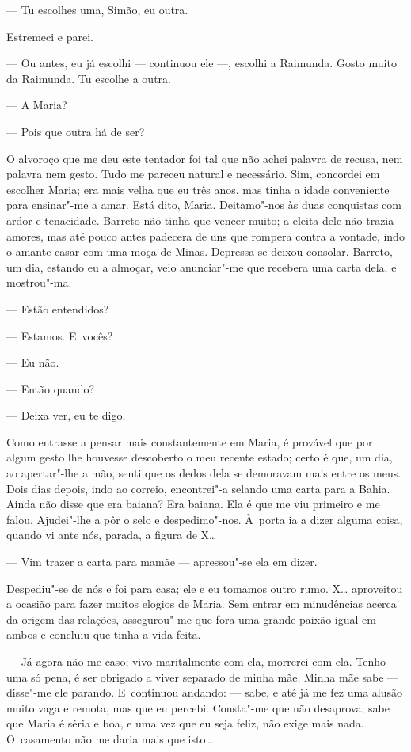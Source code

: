\begin{linenumbers}
--- Tu escolhes uma, Simão, eu outra.

Estremeci e parei.

--- Ou antes, eu já escolhi --- continuou ele ---, escolhi a Raimunda.
Gosto muito da Raimunda. Tu escolhe a outra.

--- A Maria?

--- Pois que outra há de ser?

O alvoroço que me deu este tentador foi tal que não achei palavra de
recusa, nem palavra nem gesto. Tudo me pareceu natural e necessário.
Sim, concordei em escolher Maria; era mais velha que eu três anos, mas
tinha a idade conveniente para ensinar"-me a amar. Está dito, Maria.
Deitamo"-nos às duas conquistas com ardor e tenacidade. Barreto não tinha
que vencer muito; a eleita dele não trazia amores, mas até pouco antes
padecera de uns que rompera contra a vontade, indo o amante casar com
uma moça de Minas. Depressa se deixou consolar. Barreto, um dia, estando
eu a almoçar, veio anunciar"-me que recebera uma carta dela, e
mostrou"-ma.

--- Estão entendidos?

--- Estamos. E~vocês?

--- Eu não.

--- Então quando?

--- Deixa ver, eu te digo.

Como entrasse a pensar mais constantemente em Maria, é provável que por
algum gesto lhe houvesse descoberto o meu recente estado; certo é que,
um dia, ao apertar"-lhe a mão, senti que os dedos dela se demoravam mais
entre os meus. Dois dias depois, indo ao correio, encontrei"-a selando
uma carta para a Bahia. Ainda não disse que era baiana? Era baiana. Ela
é que me viu primeiro e me falou. Ajudei"-lhe a pôr o selo e
despedimo"-nos. À~porta ia a dizer alguma coisa, quando vi ante nós,
parada, a figura de X\ldots{}

--- Vim trazer a carta para mamãe --- apressou"-se ela em dizer.

Despediu"-se de nós e foi para casa; ele e eu tomamos outro rumo. X\ldots{}
aproveitou a ocasião para fazer muitos elogios de Maria. Sem entrar em
minudências acerca da origem das relações, assegurou"-me que fora uma
grande paixão igual em ambos e concluiu que tinha a vida feita.

--- Já agora não me caso; vivo maritalmente com ela, morrerei com ela.
Tenho uma só pena, é ser obrigado a viver separado de minha mãe. Minha
mãe sabe --- disse"-me ele parando. E~continuou andando: --- sabe, e até já
me fez uma alusão muito vaga e remota, mas que eu percebi. Consta"-me que
não desaprova; sabe que Maria é séria e boa, e uma vez que eu seja
feliz, não exige mais nada. O~casamento não me daria mais que isto\ldots{}


\end{linenumbers}
